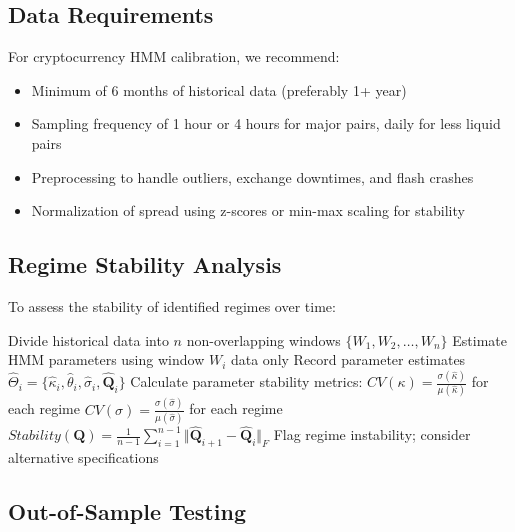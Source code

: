 \documentclass{article}
\begin{document}
\subsection{Data Requirements}

For cryptocurrency HMM calibration, we recommend:

\begin{itemize}
    \item Minimum of 6 months of historical data (preferably 1+ year)
    \item Sampling frequency of 1 hour or 4 hours for major pairs, daily for less liquid pairs
    \item Preprocessing to handle outliers, exchange downtimes, and flash crashes
    \item Normalization of spread using z-scores or min-max scaling for stability
\end{itemize}

\subsection{Regime Stability Analysis}

To assess the stability of identified regimes over time:

\begin{algorithm}
\caption{Regime Stability Analysis}
\begin{algorithmic}[1]
\STATE Divide historical data into $n$ non-overlapping windows $\{W_1, W_2, \ldots, W_n\}$
    \STATE Estimate HMM parameters using window $W_i$ data only
    \STATE Record parameter estimates $\hat{\Theta}_i = \{\hat{\kappa}_i, \hat{\theta}_i, \hat{\sigma}_i, \hat{\mathbf{Q}}_i\}$
\ENDFOR
\STATE Calculate parameter stability metrics:
    \STATE \quad $CV(\kappa) = \frac{\sigma(\hat{\kappa})}{\mu(\hat{\kappa})}$ for each regime
    \STATE \quad $CV(\sigma) = \frac{\sigma(\hat{\sigma})}{\mu(\hat{\sigma})}$ for each regime
    \STATE \quad $Stability(\mathbf{Q}) = \frac{1}{n-1}\sum_{i=1}^{n-1} \Vert \hat{\mathbf{Q}}_{i+1} - \hat{\mathbf{Q}}_i \Vert_F$
    \STATE Flag regime instability; consider alternative specifications
\ENDIF
\end{algorithmic}
\end{algorithm}

\subsection{Out-of-Sample Testing}
\end{document}
